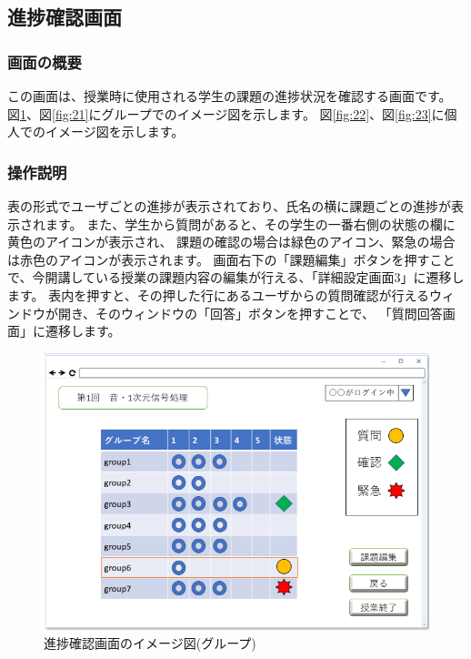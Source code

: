 \subsection{進捗確認画面}
\subsubsection{画面の概要}
この画面は、授業時に使用される学生の課題の進捗状況を確認する画面です。
図\ref{fig:20}、図\ref{fig:21}にグループでのイメージ図を示します。
図\ref{fig:22}、図\ref{fig:23}に個人でのイメージ図を示します。

\subsubsection{操作説明}
表の形式でユーザごとの進捗が表示されており、氏名の横に課題ごとの進捗が表示されます。%
また、学生から質問があると、その学生の一番右側の状態の欄に黄色のアイコンが表示され、
課題の確認の場合は緑色のアイコン、緊急の場合は赤色のアイコンが表示されます。
画面右下の「課題編集」ボタンを押すことで、今開講している授業の課題内容の編集が行える、「詳細設定画面3」に遷移します。
表内を押すと、その押した行にあるユーザからの質問確認が行えるウィンドウが開き、そのウィンドウの「回答」ボタンを押すことで、%
「質問回答画面」に遷移します。

\begin{figure}[phtbp]
  \begin{center}
    \includegraphics[width=1\linewidth,clip]{./img/20.png}
    \caption{進捗確認画面のイメージ図(グループ)}\label{fig:20}
  \end{center}
\end{figure}


